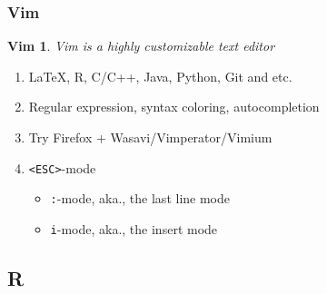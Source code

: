 \newtheorem{DEFVim}{Vim}
\begin{frame}
    \frametitle{Vim}
    \begin{DEFVim}
        Vim is a \emph{highly customizable} text editor 
    \end{DEFVim}
    \vskip0.1in
    \begin{enumerate}
        \item \LaTeX, R, C/C++, Java, Python, Git and etc.
        \item Regular expression, syntax coloring, autocompletion
        \item Try Firefox + Wasavi/Vimperator/Vimium
        \item \texttt{<ESC>}-mode
        \begin{itemize}
            \item \texttt{:}-mode, aka., the last line mode
            \item \texttt{i}-mode, aka., the insert mode
        \end{itemize}
    \end{enumerate}
\end{frame}

\subsection{R}


